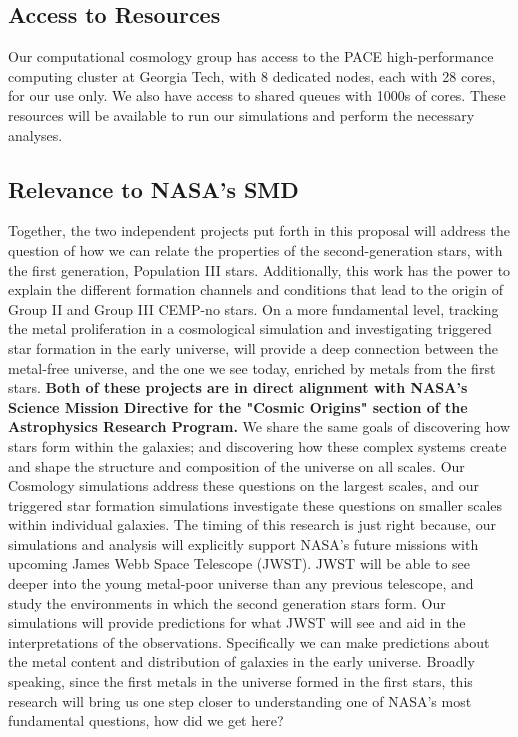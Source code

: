\documentclass[a4paper, 12pt]{article}
\begin{document}
\subsection{Access to Resources}

Our computational cosmology group has access to the PACE high-performance computing cluster at Georgia Tech, with 8 dedicated nodes, each with 28 cores, for our use only. We also have access to shared queues with 1000s of cores. These resources will be available to run our simulations and perform the necessary analyses. 

\subsection{Relevance to NASA's SMD}
Together, the two independent projects put forth in this proposal will address the question of how we can relate the properties of the second-generation stars, with the first generation, Population III stars. Additionally, this work has the power to explain the different formation channels and conditions that lead to the origin of Group II and Group III CEMP-no stars. On a more fundamental level, tracking the metal proliferation in a cosmological simulation and investigating triggered star formation in the early universe, will provide a deep connection between the metal-free universe, and the one we see today, enriched by metals from the first stars. \textbf{Both of these projects are in direct alignment with NASA's Science Mission Directive for the "Cosmic Origins" section of the Astrophysics Research Program.} We share the same goals of discovering how stars form within the galaxies; and discovering how these complex systems create and shape the structure and composition of the universe on all scales. Our Cosmology simulations address these questions on the largest scales, and our triggered star formation simulations investigate these questions on smaller scales within individual galaxies. The timing of this research is just right because, our simulations and analysis will explicitly support NASA's future missions with upcoming James Webb Space Telescope (JWST). JWST will be able to see deeper into the young metal-poor universe than any previous telescope, and study the environments in which the second generation stars form. Our simulations will provide predictions for what JWST will see and aid in the interpretations of the observations. Specifically we can make predictions about the metal content and distribution of galaxies in the early universe. Broadly speaking, since the first metals in the universe formed in the first stars, this research will bring us one step closer to understanding one of NASA's most fundamental questions, how did we get here?


\end{document}
